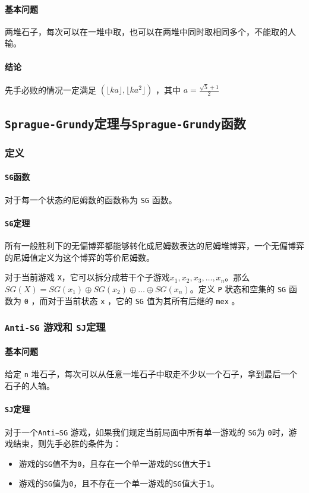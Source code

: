 \documentclass[UTF-8]{ctexart}
\begin{document}
	\paragraph{基本问题} 两堆石子，每次可以在一堆中取，也可以在两堆中同时取相同多个，不能取的人输。
	\paragraph{结论} 先手必败的情况一定满足 $(\lfloor ka\rfloor,\lfloor ka^2 \rfloor )$ ，其中 $a=\frac{\sqrt{5}+1}{2}$
	
	\subsection{\texttt{Sprague-Grundy}定理与\texttt{Sprague-Grundy}函数}
	\subsubsection{定义}
	\paragraph{\texttt{SG}函数} 对于每一个状态的尼姆数的函数称为 \texttt{SG} 函数。
	\paragraph{\texttt{SG}定理} 所有一般胜利下的无偏博弈都能够转化成尼姆数表达的尼姆堆博弈，一个无偏博弈的尼姆值定义为这个博弈的等价尼姆数。
	
	对于当前游戏 \texttt{X}，它可以拆分成若干个子游戏$x_1,x_2,x_3,\dots,x_n$。那么$SG(X)=SG(x_1)\oplus SG(x_2)\oplus\dots\oplus SG(x_n)$。定义 \texttt{P} 状态和空集的 \texttt{SG} 函数为 \texttt{0} ，而对于当前状态 \texttt{x} ，它的 \texttt{SG} 值为其所有后继的 \texttt{mex} 。
	
	\subsubsection{\texttt{Anti-SG} 游戏和 \texttt{SJ}定理}
	\paragraph{基本问题}给定 \texttt{n} 堆石子，每次可以从任意一堆石子中取走不少以一个石子，拿到最后一个石子的人输。
	\paragraph{\texttt{SJ}定理} 对于一个\texttt{Anti−SG} 游戏，如果我们规定当前局面中所有单一游戏的 \texttt{SG}为 \texttt{0}时，游戏结束，则先手必胜的条件为：
	\begin{itemize}
		\item 游戏的\texttt{SG}值不为\texttt{0}，且存在一个单一游戏的\texttt{SG}值大于\texttt{1}
		\item 游戏的\texttt{SG}值为\texttt{0}，且不存在一个单一游戏的\texttt{SG}值大于\texttt{1}。
	\end{itemize}
	
\end{document}
